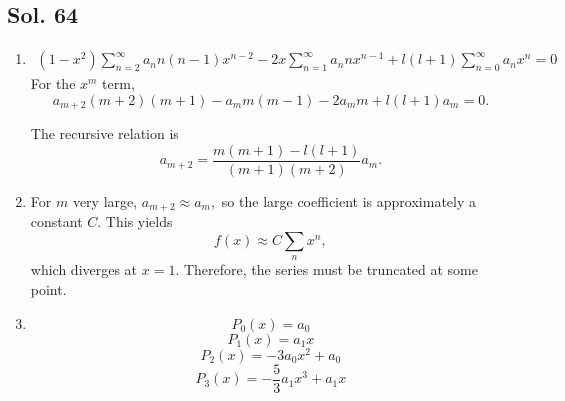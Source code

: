 \subsection*{Sol. 64}
\begin{enumerate}
    \item 
    \begin{align*}
        (1-x^2)
        \sum_{n=2}^\infty
        a_nn(n-1)x^{n-2}
        -2x\sum_{n=1}^{\infty}
        a_nnx^{n-1}
        +l(l+1)
        \sum_{n=0}^{\infty}
        a_nx^n=0
    \end{align*}
    For the $x^m$ term,
    $$
    a_{m+2}(m+2)(m+1)
    -a_mm(m-1)
    -2a_{m}m
    +l(l+1)a_m=0.
    $$

    The recursive relation is 
    $$
    a_{m+2}
    =
    \frac{m(m+1)-l(l+1)}{(m+1)(m+2)}a_m.
    $$
    \item 
    For $m$ very large, $a_{m+2}\approx a_m,$ so the large coefficient is approximately a constant $C.$
    This yields
    $$
    f(x)\approx C\sum_nx^n,
    $$
    which diverges at $x=1.$ Therefore, the series must be truncated at some point.
    \item 
    $$
    P_0(x)=a_0
    $$
    $$
    P_1(x)=a_1x
    $$
    $$
    P_2(x)=-3a_0x^2+a_0
    $$
    $$
    P_3(x)=-\frac{5}{3}a_1x^3+a_1x
    $$
    
    
\end{enumerate}


